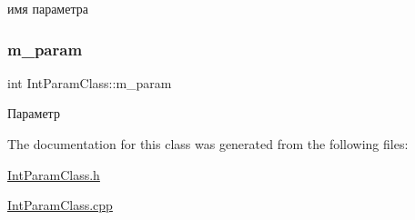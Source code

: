 имя параметра 

\mbox{\label{class_int_param_class_a6c88503cfb7954435155ced60b4bf557}} 
\subsubsection{\texorpdfstring{m\+\_\+param}{m\_param}}
{\footnotesize\ttfamily int Int\+Param\+Class\+::m\+\_\+param\hspace{0.3cm}{\ttfamily [private]}}



Параметр 



The documentation for this class was generated from the following files\+:\begin{DoxyCompactItemize}
\item 
\hyperlink{_int_param_class_8h}{Int\+Param\+Class.\+h}\item 
\hyperlink{_int_param_class_8cpp}{Int\+Param\+Class.\+cpp}\end{DoxyCompactItemize}
